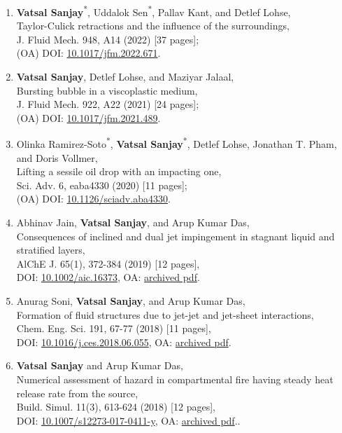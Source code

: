 \documentclass[11pt,a4paper,roman,english,colorlinks,linkcolor={red!50!black}]{moderncv}
\newcommand{\equalcontrib}[1]{\textsuperscript{#1}}
\begin{document}
\begin{enumerate}[leftmargin=0.75cm]
	\item \textbf{Vatsal Sanjay}\equalcontrib{*}, Uddalok Sen\equalcontrib{*}, Pallav Kant, and Detlef Lohse,\\
	Taylor-Culick retractions and the influence of the surroundings,\\
	J. Fluid Mech. 948, A14  (2022) [37 pages];\\
	(OA) DOI: \href{https://doi.org/10.1017/jfm.2022.671}{10.1017/jfm.2022.671}.

	\item \textbf{Vatsal Sanjay}, Detlef Lohse, and Maziyar Jalaal,\\
	Bursting bubble in a viscoplastic medium,\\
	J. Fluid Mech. 922, A22  (2021) [24 pages];\\
	(OA) DOI: \href{https://doi.org/10.1017/jfm.2021.489}{10.1017/jfm.2021.489}.

	\item Olinka Ramirez-Soto\equalcontrib{*}, \textbf{Vatsal Sanjay}\equalcontrib{*},  Detlef Lohse,  Jonathan T. Pham, and Doris Vollmer,\\
	Lifting a sessile oil drop with an impacting one,\\
	Sci. Adv. 6, eaba4330  (2020) [11 pages];\\
	(OA) DOI: \href{https://doi.org/10.1126/sciadv.aba4330}{10.1126/sciadv.aba4330}.

	\item Abhinav Jain, \textbf{Vatsal Sanjay}, and Arup Kumar Das,\\
	Consequences of inclined and dual jet impingement in stagnant liquid and stratified layers,\\
	AlChE J. 65(1), 372-384  (2019) [12 pages],\\
	DOI: \href{https://doi.org/10.1002/aic.16373}{10.1002/aic.16373}, OA: \href{https://tinyurl.com/24p5dy8s}{archived pdf}.

	\item Anurag Soni, \textbf{Vatsal Sanjay}, and Arup Kumar Das,\\
	Formation of fluid structures due to jet-jet and jet-sheet interactions,\\
	Chem. Eng. Sci. 191, 67-77  (2018) [11 pages],\\
	DOI: \href{https://doi.org/10.1016/j.ces.2018.06.055}{10.1016/j.ces.2018.06.055}, OA: \href{https://tinyurl.com/2bv5fznd}{archived pdf}.

	\item \textbf{Vatsal Sanjay} and Arup Kumar Das,\\
	Numerical assessment of hazard in compartmental fire having steady heat release rate from the source,\\
	Build. Simul. 11(3), 613-624  (2018) [12 pages],\\
	DOI: \href{https://doi.org/10.1007/s12273-017-0411-y}{10.1007/s12273-017-0411-y}, OA: \href{https://tinyurl.com/2bwhzlzv}{archived pdf}..


\end{enumerate}
\end{document}
